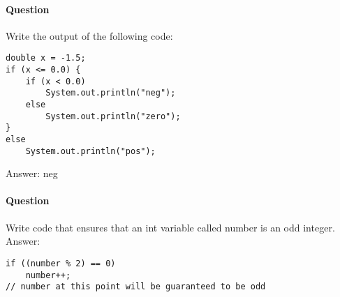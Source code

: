 \documentclass{article}
\begin{document}
\addtocounter{question_num}{1}
\paragraph{Question }
Write the output of the following code:
\begin{lstlisting}
double x = -1.5;
if (x <= 0.0) {
	if (x < 0.0)
		System.out.println("neg");
	else
		System.out.println("zero");
}
else
	System.out.println("pos");
\end{lstlisting}
{\color{red}Answer:
\newline neg
}

\addtocounter{question_num}{1}
\paragraph{Question }
Write code that ensures that an int variable called number is an odd integer.
{\color{red}Answer:}
\begin{lstlisting}
if ((number % 2) == 0)
	number++;
// number at this point will be guaranteed to be odd
\end{lstlisting}
\end{document}
